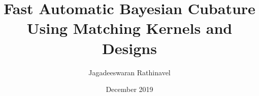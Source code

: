 \documentclass{iitthesis}          %
\begin{document}
\setlength\abovedisplayskip{0pt}
\setlength{\belowdisplayskip}{0pt}

\title{Fast Automatic Bayesian Cubature Using Matching Kernels and Designs
}
%



\author{Jagadeeswaran Rathinavel       %
}



\date{December 2019}

\maketitle


\prelimpages         %
\end{document}
